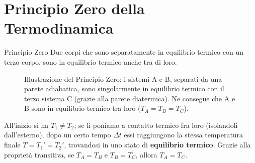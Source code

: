 \section{Principio Zero della Termodinamica}
\begin{teorema}{Principio Zero}
Due corpi che sono separatamente in equilibrio termico con un terzo corpo, sono in equilibrio termico anche tra di loro.
\end{teorema}

\begin{figure}[ht]
    \centering
    \caption{Illustrazione del Principio Zero: i sistemi A e B, separati da una parete adiabatica, sono singolarmente in equilibrio termico con il terzo sistema C (grazie alla parete diatermica). Ne consegue che A e B sono in equilibrio termico tra loro ($T_A = T_B = T_C$).}
\end{figure}

All'inizio si ha $T_1 \neq T_2$; se li poniamo a contatto termico fra loro (isolandoli dall'esterno), dopo un certo tempo $\Delta t$ essi raggiungono la stessa temperatura finale $T = T_1' = T_2'$, trovandosi in uno stato di \textbf{equilibrio termico}.
Grazie alla proprietà transitiva, se $T_A = T_B$ e $T_B = T_C$, allora $T_A = T_C$.

